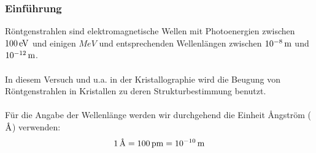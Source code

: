 \documentclass[a4paper,titlepage]{scrartcl}
\newcommand{\angstrom}{\mbox{\normalfont\AA}}
\numberwithin{equation}{section}
\begin{document}
\subsubsection{Einführung}
Röntgenstrahlen sind elektromagnetische Wellen mit Photoenergien zwischen $\unit[100]{eV}$ und einigen $\unit{MeV}$ und entsprechenden Wellenlängen zwischen $\unit[10^{-8}]{m}$ und $\unit[10^{-12}]{m}$.\\ \\
In diesem Versuch und u.a. in der Kristallographie wird die Beugung von Röntgenstrahlen in Kristallen zu deren Strukturbestimmung benutzt.\\ \\
Für die Angabe der Wellenlänge werden wir durchgehend die Einheit Ångström ($\angstrom$) verwenden:
\begin{equation*}
\unit[1]{\angstrom}=\unit[100]{pm}=\unit[10^{-10}]{m}
\end{equation*}
\end{document}
